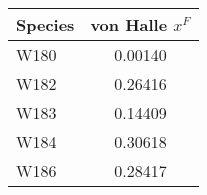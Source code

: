 \begin{tabular}{|l||c|}
\hline
\bf{Species} & \bf{von Halle $x^F$} \\ 
\hline
W180 & 0.00140 \\ 
\hline
W182 & 0.26416 \\ 
\hline
W183 & 0.14409 \\ 
\hline
W184 & 0.30618 \\ 
\hline
W186 & 0.28417 \\ 
\hline
\end{tabular}
